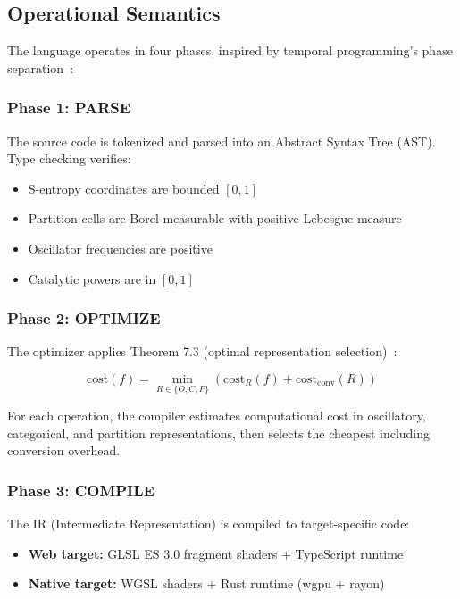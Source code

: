 \documentclass[12pt,a4paper]{article}
\begin{document}
\subsection{Operational Semantics}

The language operates in four phases, inspired by temporal programming's phase separation~\cite{sachikonye2026temporal}:

\subsubsection{Phase 1: PARSE}

The source code is tokenized and parsed into an Abstract Syntax Tree (AST). Type checking verifies:
\begin{itemize}
    \item S-entropy coordinates are bounded $[0,1]$
    \item Partition cells are Borel-measurable with positive Lebesgue measure
    \item Oscillator frequencies are positive
    \item Catalytic powers are in $[0,1]$
\end{itemize}

\subsubsection{Phase 2: OPTIMIZE}

The optimizer applies Theorem 7.3 (optimal representation selection)~\cite{sachikonye2026sentropy}:

$$\text{cost}(f) = \min_{R \in \{O, C, P\}} \left( \text{cost}_R(f) + \text{cost}_{\text{conv}}(R) \right)$$

For each operation, the compiler estimates computational cost in oscillatory, categorical, and partition representations, then selects the cheapest including conversion overhead.

\subsubsection{Phase 3: COMPILE}

The IR (Intermediate Representation) is compiled to target-specific code:

\begin{itemize}
    \item \textbf{Web target:} GLSL ES 3.0 fragment shaders + TypeScript runtime
    \item \textbf{Native target:} WGSL shaders + Rust runtime (wgpu + rayon)
\end{itemize}
\end{document}
